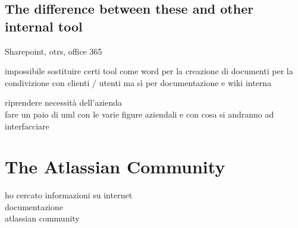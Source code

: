 	\subsection{The difference between these and other internal tool}
		Sharepoint, otrs, office 365
		
		impossibile sostituire certi tool come word per la creazione di documenti per la condivizione con clienti / utenti ma sì per documentazione e wiki interna

riprendere necessità dell'azienda\\
fare un paio di uml con le varie figure aziendali e con cosa si andranno ad interfacciare

\section{The Atlassian Community}
ho cercato informazioni su internet\\
documentazione\\
atlassian community
